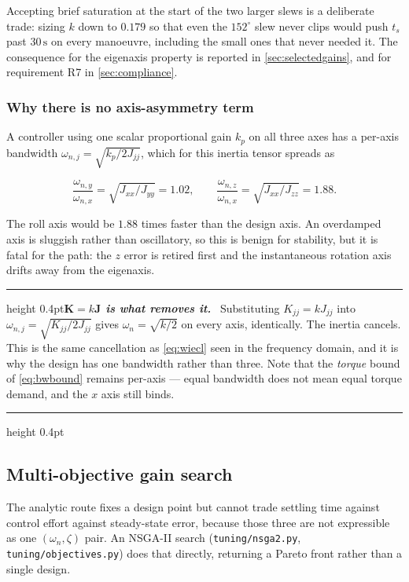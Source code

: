 \documentclass[conference,10pt,a4paper]{IEEEtran}
\newcommand{\remarkrule}{\par\nobreak\vspace{2pt}%
  \hrule height 0.4pt\vspace{4pt}\nobreak}
\newenvironment{keybox}[1][Result]
  {\par\medskip\remarkrule\noindent\small\textbf{\textit{#1.}}\ \ignorespaces}
  {\par\vspace{3pt}\hrule height 0.4pt\par\medskip\ignorespacesafterend}
\newcommand{\mat}[1]{\bm{#1}}
\newcommand{\unit}[1]{\ensuremath{\,\mathrm{#1}}}
\begin{document}
Accepting brief saturation at the start of the two larger slews is a deliberate
trade: sizing $k$ down to $0.179$ so that even the $152^\circ$ slew never clips
would push $t_s$ past $30\unit{s}$ on every manoeuvre, including the small ones
that never needed it. The consequence for the eigenaxis property is reported in
\cref{sec:selectedgains}, and for requirement R7 in \cref{sec:compliance}.

\subsubsection{Why there is no axis-asymmetry term}
\label{sec:asymmetry}

A controller using one scalar proportional gain $k_p$ on all three axes has a
per-axis bandwidth $\omega_{n,j}=\sqrt{k_p/2J_{jj}}$, which for this inertia
tensor spreads as

\begin{equation}
\frac{\omega_{n,y}}{\omega_{n,x}} = \sqrt{J_{xx}/J_{yy}} = 1.02,
\qquad
\frac{\omega_{n,z}}{\omega_{n,x}} = \sqrt{J_{xx}/J_{zz}} = 1.88 .
\label{eq:asymmetry}
\end{equation}

The roll axis would be $1.88$ times faster than the design axis. An overdamped
axis is sluggish rather than oscillatory, so this is benign for stability, but
it is fatal for the path: the $z$ error is retired first and the instantaneous
rotation axis drifts away from the eigenaxis.

\begin{keybox}[$\mat{K}=k\mat{J}$ is what removes it]
Substituting $K_{jj}=kJ_{jj}$ into $\omega_{n,j}=\sqrt{K_{jj}/2J_{jj}}$ gives
$\omega_n=\sqrt{k/2}$ on every axis, identically. The inertia cancels. This is
the same cancellation as \cref{eq:wiecl} seen in the frequency domain, and it
is why the design has one bandwidth rather than three. Note that the
\emph{torque} bound of \cref{eq:bwbound} remains per-axis --- equal bandwidth
does not mean equal torque demand, and the $x$ axis still binds.
\end{keybox}

\subsection{Multi-objective gain search}
\label{sec:ga}

The analytic route fixes a design point but cannot trade settling time against
control effort against steady-state error, because those three are not
expressible as one $(\omega_n,\zeta)$ pair. An NSGA-II search \cite{deb2002}
(\texttt{tuning/nsga2.py}, \texttt{tuning/objectives.py}) does that directly,
returning a Pareto front rather than a single design.
\end{document}
